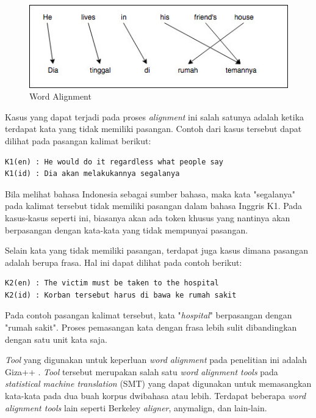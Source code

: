 \begin{figure}
	\centering
	\includegraphics[width=1\linewidth]{adit_pics/wordalignment.jpeg}
	\caption{Word Alignment}
	\label{fig:word-alignment}
\end{figure}

Kasus yang dapat terjadi pada proses \textit{alignment} ini salah satunya adalah ketika terdapat kata yang tidak memiliki pasangan. Contoh dari kasus tersebut dapat dilihat pada pasangan kalimat berikut:

\begin{lstlisting}[backgroundcolor = \color{white}]
K1(en) : He would do it regardless what people say
K1(id) : Dia akan melakukannya segalanya
\end{lstlisting}


Bila melihat bahasa Indonesia sebagai sumber bahasa, maka kata "segalanya" pada kalimat tersebut tidak memiliki pasangan dalam bahasa Inggris K1. Pada kasus-kasus seperti ini, biasanya akan ada token khusus yang nantinya akan berpasangan dengan kata-kata yang tidak mempunyai pasangan.

Selain kata yang tidak memiliki pasangan, terdapat juga kasus dimana pasangan adalah berupa frasa. Hal ini dapat dilihat pada contoh berikut:

\begin{lstlisting}[backgroundcolor = \color{white}]
K2(en) : The victim must be taken to the hospital
K2(id) : Korban tersebut harus di bawa ke rumah sakit
\end{lstlisting}

Pada contoh pasangan kalimat tersebut, kata "\textit{hospital}" berpasangan dengan "rumah sakit". Proses pemasangan kata dengan frasa lebih sulit dibandingkan dengan satu unit kata saja.

\textit{Tool} yang digunakan untuk keperluan \textit{word alignment} pada penelitian ini adalah Giza++ \citep{och03:asc}. \textit{Tool} tersebut merupakan salah satu \textit{word alignment tools} pada \textit{statistical machine translation} (SMT) yang dapat digunakan untuk memasangkan kata-kata pada dua buah korpus dwibahasa atau lebih. Terdapat beberapa \textit{word alignment tools} lain seperti Berkeley \textit{aligner}, anymalign, dan lain-lain.

